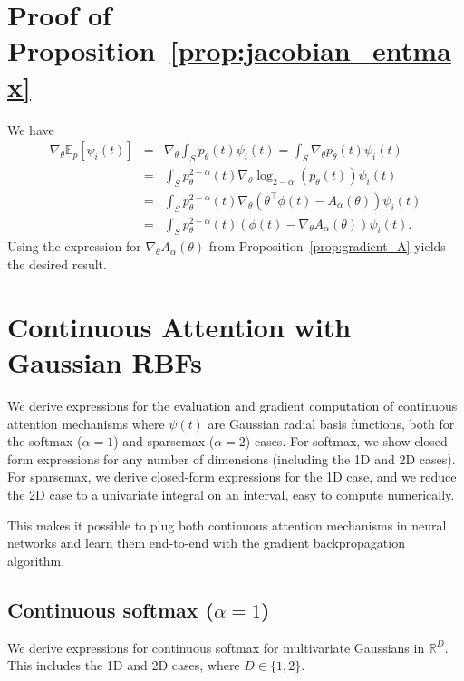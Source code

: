 \documentclass{article}
\begin{document}
\section{Proof of Proposition~\ref{prop:jacobian_entmax}}\label{sec:proof_jacobian_entmax}




We have
\begin{eqnarray}
\nabla_\theta \mathbb{E}_{p}[\psi_i(t)] &=& \nabla_\theta \int_S p_\theta(t) \psi_i(t) 
= \int_S \nabla_\theta p_\theta(t) \psi_i(t) \nonumber\\
&=& \int_S p_\theta^{2-\alpha}(t) \nabla_\theta \log_{2-\alpha}(p_\theta(t)) \psi_i(t) \nonumber\\
&=& \int_S p_\theta^{2-\alpha}(t) \nabla_\theta (\theta^\top \phi(t) - A_\alpha(\theta)) \psi_i(t) \nonumber\\
&=& \int_S p_\theta^{2-\alpha}(t) (\phi(t) - \nabla_\theta A_\alpha(\theta)) \psi_i(t).
\end{eqnarray}
Using the expression for $\nabla_\theta A_\alpha(\theta)$ from Proposition~\ref{prop:gradient_A} yields the desired result.


\section{Continuous Attention with Gaussian RBFs}\label{sec:gaussian_basis}

We derive expressions for the evaluation and gradient computation of  continuous attention mechanisms where $\psi(t)$ are Gaussian radial basis functions, both for the softmax ($\alpha=1$) and sparsemax ($\alpha=2$) cases. 
For softmax, we show closed-form expressions for any number of dimensions (including the 1D and 2D cases). 
For sparsemax, we derive closed-form expressions for the 1D case, and we reduce the 2D case to a univariate integral on an interval, easy to compute numerically. 

This makes it possible to plug both continuous attention mechanisms in neural networks and learn them end-to-end with the gradient backpropagation algorithm.


\subsection{Continuous softmax ($\alpha=1$)}

We derive expressions for continuous softmax for multivariate Gaussians in $\mathbb{R}^D$.  
This includes the 1D and 2D cases, where $D \in \{1,2\}$. 
\end{document}
